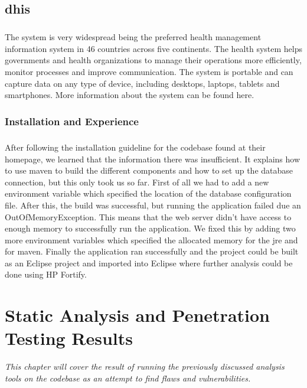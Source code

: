 \documentclass[11pt,english,a4paper]{report}
\begin{document}
\section{\gls{dhis}}
\paragraph{}
The system is very widespread being the preferred health management information system in 46 countries across five continents. 
The health system helps governments and health organizations to manage their operations more efficiently, monitor processes and improve communication. 
The system is portable and can capture data on any type of device, including desktops, laptops, tablets and smartphones. 
More information about the system can be found here. \cite{dhis2-homepage, dhis2-wiki}

\subsection{Installation and Experience}
\paragraph{}
After following the installation guideline for the codebase found at their homepage, we learned that the information there was insufficient.
It explains how to use \gls{maven} to build the different components and how to set up the database connection, but this only took us so far.
First of all we had to add a new environment variable which specified the location of the database configuration file.
After this, the build was successful, but running the application failed due an OutOfMemoryException. 
This means that the web server didn't have access to enough memory to successfully run the application. 
We fixed this by adding two more environment variables which specified the allocated memory for the \gls{jre} and for \gls{maven}.
Finally the application ran successfully and the project could be built as an Eclipse project and imported into Eclipse where further analysis could be done using HP Fortify.




\chapter{Static Analysis and Penetration Testing Results}
\textit{This chapter will cover the result of running the previously discussed analysis tools on the codebase as an attempt to find flaws and vulnerabilities.}
\end{document}
